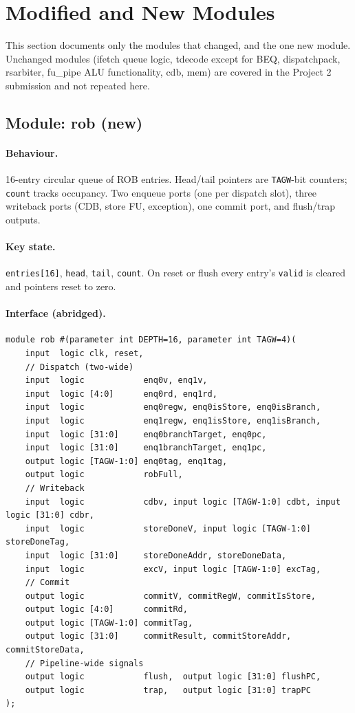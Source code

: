 \documentclass[11pt]{article}
\begin{document}
\section{Modified and New Modules}

This section documents only the modules that changed, and the one new module.
Unchanged modules (ifetch queue logic, tdecode except for BEQ, dispatchpack,
rsarbiter, fu\_pipe ALU functionality, cdb, mem) are covered in the Project 2
submission and not repeated here.

\subsection{Module: rob (new)}

\paragraph{Behaviour.}
16-entry circular queue of ROB entries. Head/tail pointers are
\texttt{TAGW}-bit counters; \texttt{count} tracks occupancy. Two enqueue ports
(one per dispatch slot), three writeback ports (CDB, store FU, exception), one
commit port, and flush/trap outputs.

\paragraph{Key state.}
\texttt{entries[16]}, \texttt{head}, \texttt{tail}, \texttt{count}. On reset or
flush every entry's \texttt{valid} is cleared and pointers reset to zero.

\paragraph{Interface (abridged).}
\begin{lstlisting}[style=verilog, caption=rob.sv port list (abridged)]
module rob #(parameter int DEPTH=16, parameter int TAGW=4)(
    input  logic clk, reset,
    // Dispatch (two-wide)
    input  logic            enq0v, enq1v,
    input  logic [4:0]      enq0rd, enq1rd,
    input  logic            enq0regw, enq0isStore, enq0isBranch,
    input  logic            enq1regw, enq1isStore, enq1isBranch,
    input  logic [31:0]     enq0branchTarget, enq0pc,
    input  logic [31:0]     enq1branchTarget, enq1pc,
    output logic [TAGW-1:0] enq0tag, enq1tag,
    output logic            robFull,
    // Writeback
    input  logic            cdbv, input logic [TAGW-1:0] cdbt, input logic [31:0] cdbr,
    input  logic            storeDoneV, input logic [TAGW-1:0] storeDoneTag,
    input  logic [31:0]     storeDoneAddr, storeDoneData,
    input  logic            excV, input logic [TAGW-1:0] excTag,
    // Commit
    output logic            commitV, commitRegW, commitIsStore,
    output logic [4:0]      commitRd,
    output logic [TAGW-1:0] commitTag,
    output logic [31:0]     commitResult, commitStoreAddr, commitStoreData,
    // Pipeline-wide signals
    output logic            flush,  output logic [31:0] flushPC,
    output logic            trap,   output logic [31:0] trapPC
);
\end{lstlisting}
\end{document}
